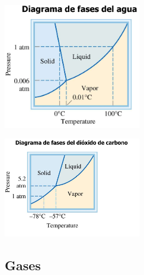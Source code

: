             \begin{center} \includegraphics[width=6cm]{./imagenes/diagramaDeFasesDelAgua.png} \end{center}
            \begin{center} \includegraphics[width=6cm]{./imagenes/diagramaDeFasesDelCO2.png} \end{center}
    \subsection{Gases}
        
